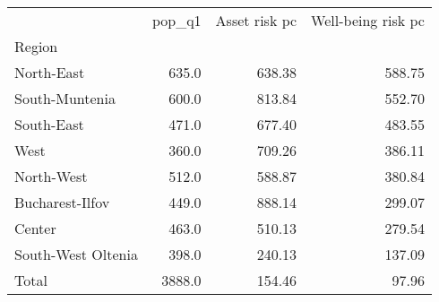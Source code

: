 \begin{tabular}{lrrr}
\toprule
{} &  pop\_q1 &  Asset risk pc &  Well-being risk pc \\
Region             &         &                &                     \\
\midrule
North-East         &   635.0 &         638.38 &              588.75 \\
South-Muntenia     &   600.0 &         813.84 &              552.70 \\
South-East         &   471.0 &         677.40 &              483.55 \\
West               &   360.0 &         709.26 &              386.11 \\
North-West         &   512.0 &         588.87 &              380.84 \\
Bucharest-Ilfov    &   449.0 &         888.14 &              299.07 \\
Center             &   463.0 &         510.13 &              279.54 \\
South-West Oltenia &   398.0 &         240.13 &              137.09 \\
Total              &  3888.0 &         154.46 &               97.96 \\
\bottomrule
\end{tabular}
